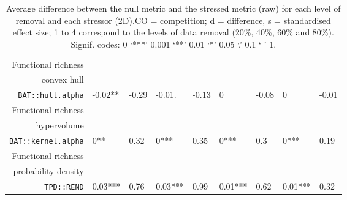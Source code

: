 \begin{table}[ht]
\begin{tabular}{rllllllll}
  Functional richness\\convex hull\\\texttt{BAT::hull.alpha} & -0.02** & -0.29 & -0.01. & -0.13 & 0 & -0.08 & 0 & -0.01 \\ 
  Functional richness\\hypervolume\\\texttt{BAT::kernel.alpha} & 0** & 0.32 & 0*** & 0.35 & 0*** & 0.3 & 0*** & 0.19 \\ 
  Functional richness\\probability density\\\texttt{TPD::REND} & 0.03*** & 0.76 & 0.03*** & 0.99 & 0.01*** & 0.62 & 0.01*** & 0.32 \\ 
   \hline
\end{tabular}
\caption{Average difference between the null metric and the stressed metric (raw) for each level of removal and each stressor (2D).CO = competition; d = difference, s = standardised effect size; 1 to 4 correspond to the levels of data removal (20\%, 40\%, 60\% and 80\%). Signif. codes:  0 ‘***’ 0.001 ‘**’ 0.01 ‘*’ 0.05 ‘.’ 0.1 ‘ ’ 1.} 
\end{table}
